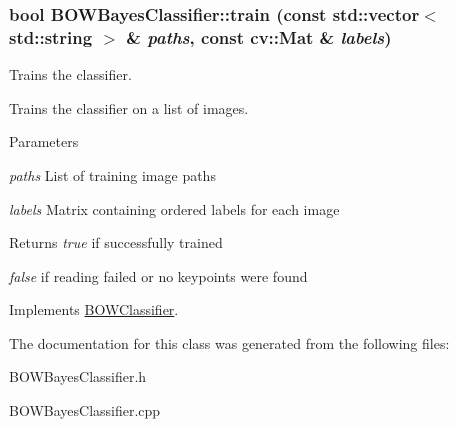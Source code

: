 \hypertarget{classBOWBayesClassifier_a66e43076ec168747b903705ea2448939}{
\subsubsection[{train}]{\setlength{\rightskip}{0pt plus 5cm}bool BOWBayesClassifier::train (const std::vector$<$ std::string $>$ \& {\em paths}, \/  const cv::Mat \& {\em labels})}}
\label{classBOWBayesClassifier_a66e43076ec168747b903705ea2448939}


Trains the classifier. 

Trains the classifier on a list of images.


\begin{DoxyParams}{Parameters}
\item[{\em paths}]List of training image paths \item[{\em labels}]Matrix containing ordered labels for each image \end{DoxyParams}
\begin{DoxyReturn}{Returns}
{\itshape true\/} if successfully trained\par
 {\itshape false\/} if reading failed or no keypoints were found 
\end{DoxyReturn}


Implements \hyperlink{classBOWClassifier_a8a00f5cadf166f361a411d5a4e67b4d6}{BOWClassifier}.



The documentation for this class was generated from the following files:\begin{DoxyCompactItemize}
\item 
BOWBayesClassifier.h\item 
BOWBayesClassifier.cpp\end{DoxyCompactItemize}

